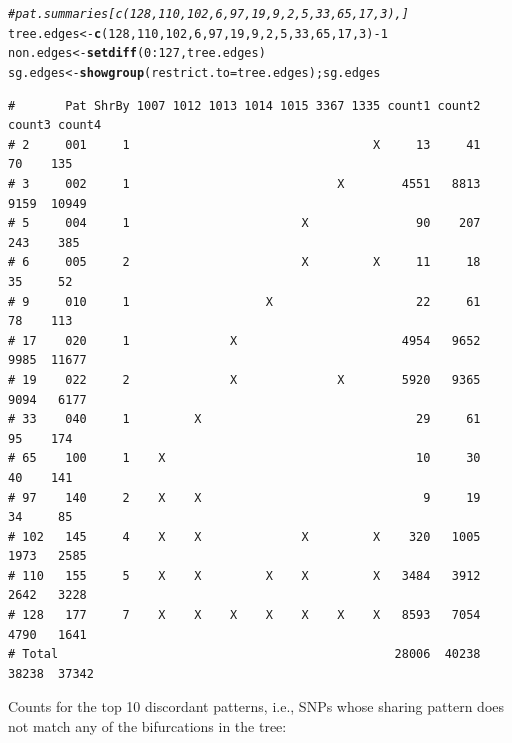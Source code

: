 \documentclass{article}\usepackage[]{graphicx}\usepackage[]{color}
\makeatletter
\newcommand{\hlnum}[1]{\textcolor[rgb]{0.686,0.059,0.569}{#1}}%
\newcommand{\hlcom}[1]{\textcolor[rgb]{0.678,0.584,0.686}{\textit{#1}}}%
\newcommand{\hlopt}[1]{\textcolor[rgb]{0,0,0}{#1}}%
\newcommand{\hlstd}[1]{\textcolor[rgb]{0.345,0.345,0.345}{#1}}%
\newcommand{\hlkwb}[1]{\textcolor[rgb]{0.69,0.353,0.396}{#1}}%
\newcommand{\hlkwc}[1]{\textcolor[rgb]{0.333,0.667,0.333}{#1}}%
\newcommand{\hlkwd}[1]{\textcolor[rgb]{0.737,0.353,0.396}{\textbf{#1}}}%
\newenvironment{kframe}{%
 \def\at@end@of@kframe{}%
 \ifinner\ifhmode%
  \def\at@end@of@kframe{\end{minipage}}%
  \begin{minipage}{\columnwidth}%
 \fi\fi%
 \def\FrameCommand##1{\hskip\@totalleftmargin \hskip-\fboxsep
 \colorbox{shadecolor}{##1}\hskip-\fboxsep
     \hskip-\linewidth \hskip-\@totalleftmargin \hskip\columnwidth}%
 \MakeFramed {\advance\hsize-\width
   \@totalleftmargin\z@ \linewidth\hsize
   \@setminipage}}%
 {\par\unskip\endMakeFramed%
 \at@end@of@kframe}
\newenvironment{knitrout}{}{} %
\makeatother
\begin{document}
\begin{knitrout}\scriptsize
{}\color{fgcolor}\begin{kframe}
\begin{alltt}
\hlcom{#pat.summaries[c(128,110,102,6,97,19,9,2,5,33,65,17,3),]}
\hlstd{tree.edges} \hlkwb{<-} \hlkwd{c}\hlstd{(}\hlnum{128}\hlstd{,}\hlnum{110}\hlstd{,}\hlnum{102}\hlstd{,}\hlnum{6}\hlstd{,}\hlnum{97}\hlstd{,}\hlnum{19}\hlstd{,}\hlnum{9}\hlstd{,}\hlnum{2}\hlstd{,}\hlnum{5}\hlstd{,}\hlnum{33}\hlstd{,}\hlnum{65}\hlstd{,}\hlnum{17}\hlstd{,}\hlnum{3}\hlstd{)}\hlopt{-}\hlnum{1}
\hlstd{non.edges} \hlkwb{<-} \hlkwd{setdiff}\hlstd{(}\hlnum{0}\hlopt{:}\hlnum{127}\hlstd{, tree.edges)}
\hlstd{sg.edges} \hlkwb{<-} \hlkwd{showgroup}\hlstd{(}\hlkwc{restrict.to}\hlstd{=tree.edges) ; sg.edges}
\end{alltt}
\begin{verbatim}
#       Pat ShrBy 1007 1012 1013 1014 1015 3367 1335 count1 count2 count3 count4
# 2     001     1                                  X     13     41     70    135
# 3     002     1                             X        4551   8813   9159  10949
# 5     004     1                        X               90    207    243    385
# 6     005     2                        X         X     11     18     35     52
# 9     010     1                   X                    22     61     78    113
# 17    020     1              X                       4954   9652   9985  11677
# 19    022     2              X              X        5920   9365   9094   6177
# 33    040     1         X                              29     61     95    174
# 65    100     1    X                                   10     30     40    141
# 97    140     2    X    X                               9     19     34     85
# 102   145     4    X    X              X         X    320   1005   1973   2585
# 110   155     5    X    X         X    X         X   3484   3912   2642   3228
# 128   177     7    X    X    X    X    X    X    X   8593   7054   4790   1641
# Total                                               28006  40238  38238  37342
\end{verbatim}
\end{kframe}
\end{knitrout}

Counts for the top 10 discordant patterns, i.e., SNPs whose sharing pattern does not match any of the bifurcations in the tree:
\end{document}
